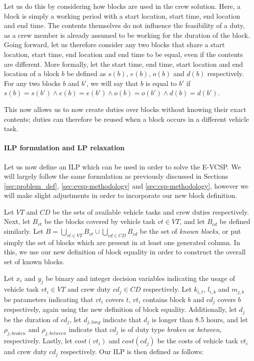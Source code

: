 \documentclass[]{article}
\begin{document}
Let us do this by considering how blocks are used in the crew solution. Here, a block is simply a working period with a start location, start time, end location and end time. The contents themselves do not influence the feasibility of a duty, as a crew member is already assumed to be working for the duration of the block. Going forward, let us therefore consider any two blocks that share a start location, start time, end location and end time to be equal, even if the contents are different. More formally, let the start time, end time, start location and end location of a block $b$ be defined as $s(b)$, $e(b)$, $o(b)$ and $d(b)$ respectively. For any two blocks $b$ and $b'$, we will say that $b$ is equal to $b'$ if $s(b) = s(b') \wedge e(b) = e(b') \wedge o(b) = o(b') \wedge d(b) = d(b')$. 

This now allows us to now create duties over blocks without knowing their exact contents; duties can therefore be reused when a block occurs in a different vehicle task. 

\paragraph{ILP formulation and LP relaxation} Let us now define an ILP which can be used in order to solve the E-VCSP. We will largely follow the same formulation as previously discussed in Sections \ref{sec:problem_def}, \ref{sec:evsp-methodology} and \ref{sec:csp-methodology}, however we will make slight adjustments in order to incorporate our new block definition. 

Let $VT$ and $CD$ be the sets of available vehicle tasks and crew duties respectively. Next, let $B_{vt}$ be the blocks covered by vehicle task $vt \in VT$, and let $B_{cd}$ be defined similarly. Let $B = \bigcup_{vt \in VT} B_{vt} \cup \bigcup_{cd \in CD} B_{cd}$ be the set of \emph{known blocks}, or put simply the set of blocks which are present in at least one generated column. In this, we use our new definition of block equality in order to construct the overall set of known blocks. 

Let $x_i$ and $y_j$ be binary and integer decision variables indicating the usage of vehicle task $vt_i \in VT$ and crew duty $cd_j \in CD$ respectively. Let $k_{i,t}$, $l_{i,b}$ and $m_{j,b}$ be parameters indicating that $vt_i$ covers $t$, $vt_i$ contains block $b$ and $cd_j$ covers $b$ respectively, again using the new definition of block equality. Additionally, let $d_j$ be the duration of $cd_j$, let $d_{j,\textit{long}}$ indicate that $d_j$ is longer than 8.5 hours, and let $\rho_{j,\textit{broken}}$ and $\rho_{j,\textit{between}}$ indicate that $cd_j$ is of duty type \textit{broken} or \textit{between}, respectively. Lastly, let $cost(vt_i)$ and $cost(cd_j)$ be the costs of vehicle task $vt_i$ and crew duty $cd_j$ respectively. Our ILP is then defined as follows:
\end{document}
